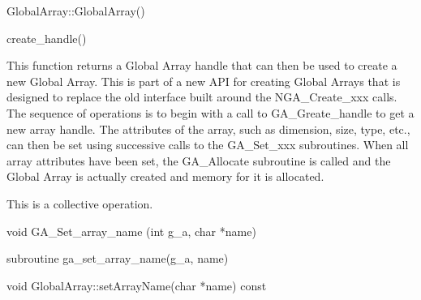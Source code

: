 \documentclass[12pt]{article}
\begin{document}
\begin{cxxapi}
\begin{cxxcode}
GlobalArray::GlobalArray()
\end{cxxcode}
\end{cxxapi}

\begin{pyapi}
\begin{pycode}
create_handle()
\end{pycode}
\end{pyapi}
\dcoll

\begin{desc}

  This function returns a Global Array handle that can then be used to
  create a new Global Array. This is part of a new API for creating
  Global Arrays that is designed to replace the old interface built
  around the NGA_Create_xxx calls. The sequence of operations is to
  begin with a call to GA_Greate_handle to get a new array handle. The
  attributes of the array, such as dimension, size, type, etc., can
  then be set using successive calls to the GA_Set_xxx subroutines.
  When all array attributes have been set, the GA_Allocate subroutine
  is called and the Global Array is actually created and memory for it
  is allocated.

  This is a collective operation.

\end{desc}



\begin{capi}
\begin{ccode}
void GA_Set_array_name (int g_a, char *name)
\end{ccode}
\begin{funcargs}
\end{funcargs}
\end{capi}

\begin{fapi}
\begin{fcode}
subroutine ga_set_array_name(g_a, name)
\end{fcode}
\begin{funcargs}
\end{funcargs}
\end{fapi}

\begin{cxxapi}
\begin{cxxcode}
void GlobalArray::setArrayName(char *name) const
\end{cxxcode}
\begin{funcargs}
\end{funcargs}
\end{cxxapi}
\end{document}
